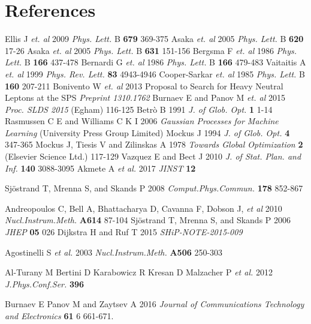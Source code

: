 \documentclass[a4paper]{jpconf}
\theoremstyle{my_theorem_style}
\numberwithin{equation}{section}
\begin{document}
\ack

\section*{References}

\begin{thebibliography}{9}
 Ellis J {\it et. al} 2009 {\it Phys. Lett.} B {\bf679} 369-375
 Asaka  {\it et. al} 2005 {\it Phys. Lett.} B {\bf 620} 17-26
 Asaka {\it et. al} 2005 {\it Phys. Lett.} B {\bf 631} 151-156
 Bergsma F {\it et. al} 1986 {\it Phys. Lett.} B {\bf 166} 437-478
 Bernardi G {\it et. al} 1986 {\it Phys. Lett.} B {\bf 166} 479-483
 Vaitaitis A {\it et. al} 1999 {\it Phys. Rev. Lett.} {\bf 83} 4943-4946
 Cooper-Sarkar {\it et. al} 1985 {\it Phys. Lett.} B {\bf 160} 207-211
 Bonivento W {\it et. al} 2013 Proposal to Search for Heavy Neutral Leptons at the SPS {\it Preprint 1310.1762}
 Burnaev E and Panov M {\it et. al} 2015 {\it Proc. SLDS 2015} (Egham) 116-125
 Betr{\`o} B 1991 {\it J. of Glob. Opt.} {\bf 1} 1-14
 Rasmussen C E and Williams C K I 2006 {\it Gaussian Processes for Machine Learning} (University Press Group Limited)
 Mockus J 1994 {\it J. of Glob. Opt.} {\bf 4} 347-365
 Mockus J, Tiesis V and Zilinskas A 1978 {\it Towards Global Optimization} {\bf 2} (Elsevier Science Ltd.) 117-129
 Vazquez E and Bect J 2010 {\it J. of Stat. Plan. and Inf.} {\bf 140} 3088-3095
 Akmete A {\it et al.} 2017 {\it JINST} {\bf 12}

Sj\"{o}strand T, Mrenna S, and Skands P  2008
\emph{Comput.Phys.Commun.} \textbf{178} 852-867

Andreopoulos C, Bell A, Bhattacharya D, Cavanna F, Dobson J, {\it et al} 2010 \emph{Nucl.Instrum.Meth.} \textbf{A614} 87-104
Sj\"{o}strand T, Mrenna S, and Skands P 2006 \emph{JHEP} \textbf{05} 026
Dijkstra H and Ruf T 2015 {\it SHiP-NOTE-2015-009}

Agostinelli S {\it et al.} 2003 \emph{Nucl.Instrum.Meth.} \textbf{A506} 250-303

Al-Turany M Bertini D Karabowicz R Kresan D Malzacher P {\it et al.} 2012 \emph{J.Phys.Conf.Ser.} \textbf{396} 

 Burnaev E Panov M and Zaytsev A 2016 {\it Journal of Communications Technology and Electronics} {\bf 61} 6 661-671.
\end{thebibliography}


\appendix
\end{document}
